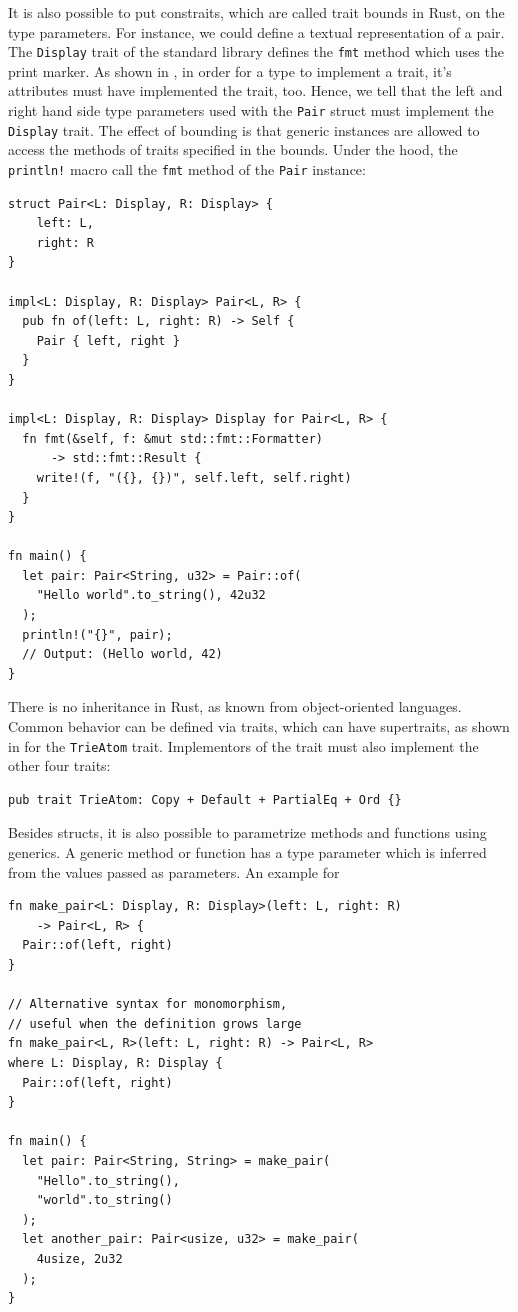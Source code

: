 \documentclass[paper=a4,%
  twoside,%
  BCOR4mm,%
  abstract=true,%
  toc=bibliography,%
  chapterprefix=true,%
  toc=bibliographynumbered,%
  open=right,%
  english,%
  pagesize=pdftex]{scrreprt}
\begin{document}
It is also possible to put constraits, which are called trait bounds in Rust, on the type parameters. For instance, we could define a textual representation of a pair. The \texttt{Display} trait of the standard library defines the \texttt{fmt} method which uses the \texttt{\string{\string}} print marker. As shown in , in order for a type to implement a trait, it's attributes must have implemented the trait, too. Hence, we tell that the left and right hand side type parameters used with the \texttt{Pair} struct must implement the \texttt{Display} trait. The effect of bounding is that generic instances are allowed to access the methods of traits specified in the bounds. Under the hood, the \texttt{println!} macro call the \texttt{fmt} method of the \texttt{Pair} instance:
\begin{lstlisting}[style=boxed, caption={}, label=lst:example-trait-bounds]
struct Pair<L: Display, R: Display> {
    left: L,
    right: R
}

impl<L: Display, R: Display> Pair<L, R> {
  pub fn of(left: L, right: R) -> Self {
    Pair { left, right }
  }
}

impl<L: Display, R: Display> Display for Pair<L, R> {
  fn fmt(&self, f: &mut std::fmt::Formatter)
      -> std::fmt::Result {
    write!(f, "({}, {})", self.left, self.right)
  }
}

fn main() {
  let pair: Pair<String, u32> = Pair::of(
    "Hello world".to_string(), 42u32
  );
  println!("{}", pair);
  // Output: (Hello world, 42)
}
\end{lstlisting}

There is no inheritance in Rust, as known from object-oriented languages. Common behavior can be defined via traits, which can have supertraits, as shown in  for the \texttt{TrieAtom} trait. Implementors of the trait must also implement the other four traits:
\begin{lstlisting}[style=boxed, caption={An example trait from the \textit{trying} crate which we evaluate the approach on}, label=lst:trying-supertraits]
pub trait TrieAtom: Copy + Default + PartialEq + Ord {}
\end{lstlisting}

Besides structs, it is also possible to parametrize methods and functions using generics. A generic method or function has a type parameter which is inferred from the values passed as parameters. An example for
\begin{lstlisting}[style=boxed, caption={Variants of defining a generic function}, label=lst:function-monomorphization]
fn make_pair<L: Display, R: Display>(left: L, right: R)
    -> Pair<L, R> {
  Pair::of(left, right)
}

// Alternative syntax for monomorphism,
// useful when the definition grows large
fn make_pair<L, R>(left: L, right: R) -> Pair<L, R>
where L: Display, R: Display {
  Pair::of(left, right)
}

fn main() {
  let pair: Pair<String, String> = make_pair(
    "Hello".to_string(),
    "world".to_string()
  );
  let another_pair: Pair<usize, u32> = make_pair(
    4usize, 2u32
  );
}
\end{lstlisting}
\end{document}
